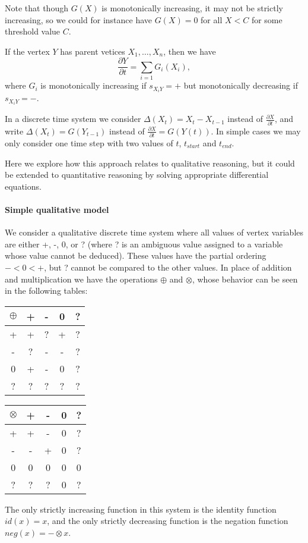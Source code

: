 Note that though $G(X)$ is monotonically increasing, it may not be strictly
increasing, so we could for instance have $G(X) = 0$ for all $X < C$
for some threshold value $C$.

If the vertex $Y$ has parent vetices $X_1,\ldots,X_n$, then we have
\[\frac{\partial Y}{\partial t} = \sum_{i=1}G_i(X_i),\]
where $G_i$ is monotonically increasing if $s_{X_iY}=+$ but monotonically
decreasing if $s_{X_iY}=-$.

In a discrete time system we consider $\Delta(X_t) = X_t - X_{t-1}$
instead of $\frac{\partial X}{\partial t}$, and write
$\Delta(X_t) = G(Y_{t-1})$ instead of
$\frac{\partial X}{\partial t} = G(Y(t))$.
%
In simple cases we may only consider one time step with two values of
$t$, $t_{start}$ and $t_{end}$.

Here we explore how this approach relates to qualitative reasoning,
but it could be extended to quantitative reasoning by solving
appropriate differential equations.

\paragraph{Simple qualitative model}

We consider a qualitative discrete time system where all values of
vertex variables are either +, -, 0, or ? (where ? is an ambiguous value assigned
to a variable whose value cannot be deduced). These values have the partial
ordering $- < 0 < +$, but ? cannot be compared to the other values. In place of
addition and multiplication we have the operations $\oplus$ and $\otimes$, whose
behavior can be seen in the following tables:
\begin{center}
\begin{tabular}{c|cccc}
$\oplus$ & + & - & 0 & ?\\
\hline
  +   & +  & ? & + & ?\\
  -   & ?  & - & - & ?\\
  0   & +  & - & 0 & ?\\
  ?   & ?  & ? & ? & ?\\
\end{tabular}
\quad
\begin{tabular}{c|cccc}
$\otimes$ & + & - & 0 & ?\\
\hline
  +   & +  & - & 0 & ?\\
  -   & -  & + & 0 & ?\\
  0   & 0  & 0 & 0 & 0\\
  ?   & ?  & ? & 0 & ?\\
\end{tabular}
\end{center}
The only
strictly increasing function in this system is the identity function $id(x) =
x$, and the only strictly decreasing function is the negation function $neg(x) =-\otimes x$.

